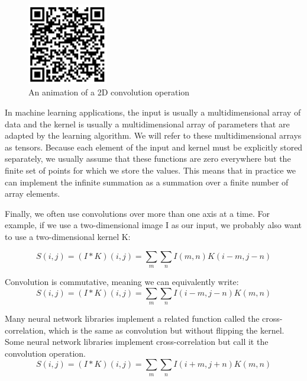 \documentclass{report}
\begin{document}
\begin{figure}[ht]
	\includegraphics[width=100pt]{26}
	\centering
	\caption{An animation of a 2D convolution operation}
\end{figure}

In machine learning applications, the input is usually a multidimensional array of data and the kernel is usually a multidimensional array of parameters that are adapted by the learning algorithm. We will refer to these multidimensional arrays as tensors. Because each element of the input and kernel must be explicitly stored separately, we usually assume that these functions are zero everywhere but the ﬁnite set of points for which we store the values. This means that in practice we can implement the inﬁnite summation as a summation over a ﬁnite number of array elements.

Finally, we often use convolutions over more than one axis at a time. For example, if we use a two-dimensional image I as our input, we probably also want to use a two-dimensional kernel K:

$$S(i,j) = (I \ast K)(i, j) = \sum_m \sum_n I(m,n)K(i-m, j-n)$$

Convolution is commutative, meaning we can equivalently write:
$$S(i,j) = (I \ast K)(i, j) = \sum_m \sum_n I(i-m,j-n)K(m, n)$$

Many neural network libraries implement a related function called the cross-correlation, which is the same as convolution but without flipping the kernel. Some neural network libraries implement cross-correlation but call it the convolution operation.
$$S(i,j) = (I \ast K)(i, j) = \sum_m \sum_n I(i+m,j+n)K(m, n)$$
\end{document}
